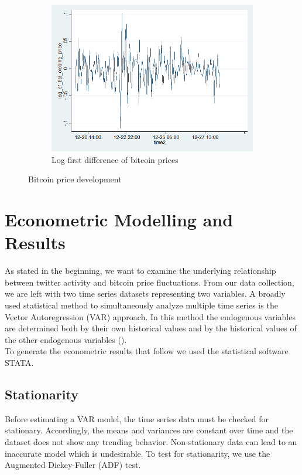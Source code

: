 \documentclass[a4paper,american,12pt]{article}
\begin{document}
\begin{spacing}{1.2}
\begin{figure}[H]
\begin{subfigure}{.3\textwidth}
	\includegraphics[width=1.12\textwidth]{stata_export_graphs/graph_plot_log_df_bpi.png}
	\caption{Log first difference of bitcoin prices}
	\end{subfigure}
\caption{Bitcoin price development}
\end{figure}
	
\clearpage

\section{Econometric Modelling and Results}
\label{sec:EconometricModellingandResults}
As stated in the beginning, we want to examine the underlying relationship between twitter activity and bitcoin price fluctuations. From our data collection, we are left with two time series datasets representing two variables. A broadly used statistical method to simultaneously analyze multiple time series is the Vector Autoregression (VAR) approach. In this method the endogenous variables are determined both by their own historical values and by the historical values of the other endogenous variables (\cite[pp.~4--5]{lütkepohl2007new}).\\
To generate the econometric results that follow we used the statistical software STATA.

\subsection{Stationarity}
Before estimating a VAR model, the time series data must be checked for stationary. Accordingly, the means and variances are constant over time and the dataset does not show any trending behavior. Non-stationary data can lead to an inaccurate model which is undesirable. To test for stationarity, we use the Augmented Dickey-Fuller (ADF) test.\\


\end{spacing}
\end{document}
